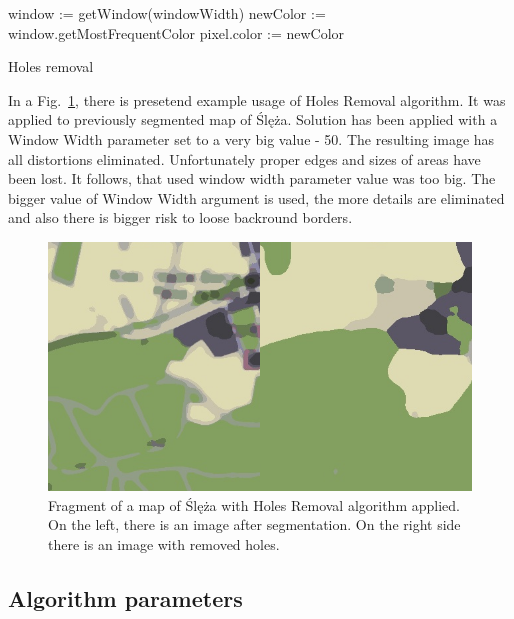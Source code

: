 \documentclass[a4paper,onecolumn,oneside,12pt]{memoir}
\begin{document}
\begin{algorithm}[!ht]

  {
    window := getWindow(windowWidth)\;
    newColor := window.getMostFrequentColor\;
    pixel.color := newColor\;
  }


  \caption{Holes removal}
  \label{holesRemovalAlgorithm}
\end{algorithm}

In a Fig.~\ref{holeRemovalResult}, there is presetend example usage of Holes Removal algorithm. It
was applied to previously segmented map of Ślęża. Solution has been applied with a Window Width
parameter set to a very big value - 50. The resulting image has all distortions eliminated.
Unfortunately proper edges and sizes of areas have been lost. It follows, that used window width
parameter value was too big. The bigger value of Window Width argument is used, the more details
are eliminated and also there is bigger risk to loose backround borders.

\begin{figure}[!ht]
\begin{center}
\includegraphics[scale=0.5]{images/holeRemovalResult.png}
\caption{Fragment of a map of Ślęża with Holes Removal algorithm applied.
On the left, there is an image after segmentation. On the right side there is an image with removed
holes.}
\label{holeRemovalResult}
\end{center}
\end{figure}

\subsection{Algorithm parameters}
\end{document}
